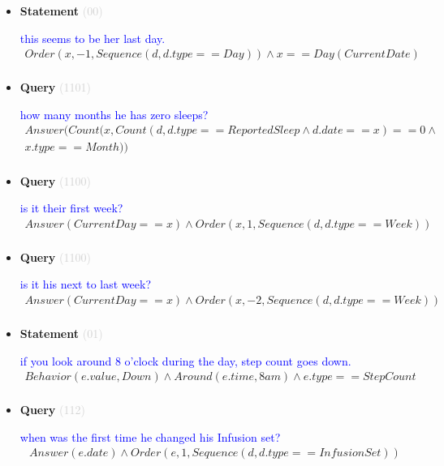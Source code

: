 \documentclass[11pt]{article}
\newcommand{\key}[1]{\textcolor{lightgray}{#1}}
\newcounter{CQuery}
\newcounter{CStatement}
\begin{document}
\begin{itemize}
\item
\textbf{Statement\theCStatement} \key{(00)} \addtocounter{CStatement}{1}
\textcolor{blue}{ this seems to be her last day. }
\begin{multline*}
Order(x, -1, Sequence(d, d.type==Day)) \wedge x==Day(CurrentDate) \\ 
\end{multline*}


\item
\textbf{Query\theCQuery} \key{(1101)} \addtocounter{CQuery}{1}
\textcolor{blue}{ how many months he has zero sleeps? }
\begin{multline*}
Answer(Count(x, Count(d, d.type==ReportedSleep \wedge d.date==x)==0 \wedge \\ 
x.type==Month)) \\ 
\end{multline*}


\item
\textbf{Query\theCQuery} \key{(1100)} \addtocounter{CQuery}{1}
\textcolor{blue}{ is it their first week? }
\begin{multline*}
Answer(CurrentDay==x) \wedge Order(x, 1, Sequence(d, d.type==Week)) \\ 
\end{multline*}


\item
\textbf{Query\theCQuery} \key{(1100)} \addtocounter{CQuery}{1}
\textcolor{blue}{ is it his next to last week? }
\begin{multline*}
Answer(CurrentDay==x) \wedge Order(x, -2, Sequence(d, d.type==Week)) \\ 
\end{multline*}


\item
\textbf{Statement\theCStatement} \key{(01)} \addtocounter{CStatement}{1}
\textcolor{blue}{ if you look around 8 o'clock during the day, step count goes down. }
\begin{multline*}
Behavior(e.value, Down) \wedge Around(e.time, 8am) \wedge e.type==StepCount \\ 
\end{multline*}


\item
\textbf{Query\theCQuery} \key{(112)} \addtocounter{CQuery}{1}
\textcolor{blue}{ when was the first time he changed his Infusion set? }
\begin{multline*}
Answer(e.date) \wedge Order(e, 1, Sequence(d, d.type==InfusionSet)) \\ 
\end{multline*}



\end{itemize}
\end{document}
